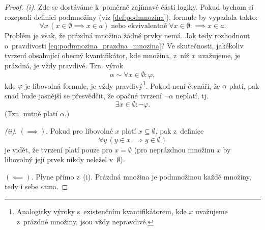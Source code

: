 \begin{proof}
    \textit{(i)}. Zde se dostáváme k~poměrně zajímavé části logiky. Pokud bychom si rozepsali definici podmnožiny (viz \ref{def:podmnozina}), formule by vypadala takto:
    \begin{equation}\label{eq:podmnozina_prazdna_mnozina}
        \forall x\,(x\in\emptyset \implies x\in a)\;\text{nebo ekvivalentně}\;\forall x\in\emptyset:\implies x\in a.
    \end{equation}
    Problém je však, že prázdná množina žádné prvky nemá. Jak tedy rozhodnout o~pravdivosti \eqref{eq:podmnozina_prazdna_mnozina}? Ve skutečnosti, jakékoliv tvrzení obsahující obecný kvantifikátor, kde množina, z~níž $x$ uvažujeme, je prázdná, je vždy pravdivé. Tzn. výrok
    \begin{equation*}
        \alpha\sim\forall x\in\emptyset: \varphi,
    \end{equation*}
    kde $\varphi$ je libovolná formule, je vždy pravdivý\footnote{Analogicky výroky s~existenčním kvantifikátorem, kde $x$ uvažujeme z~prázdné množiny, jsou vždy nepravdivé.}. Pokud není čtenáři, že $\alpha$ platí, pak snad bude jasnější se přesvědčit, že opačné tvrzení $\neg\alpha$ neplatí, tj.
    \begin{equation*}
        \exists x\in\emptyset: \neg\varphi.
    \end{equation*}
    (Tzn. nutně platí $\alpha$.)\par
    \textit{(ii)}. \textit{$(\implies)$}. Pokud pro libovolné $x$ platí $x\subseteq\emptyset$, pak z~definice
    \begin{equation*}
        \forall y\,(y\in x \implies y\in\emptyset)
    \end{equation*}
    je vidět, že tvrzení platí pouze pro $x=\emptyset$ (pro neprázdnou množinu $x$ by libovolný její prvek nikdy neležel v~$\emptyset$).\par
    \textit{$(\impliedby)$}. Plyne přímo z~(i). Prázdná množina je podmnožinou každé množiny, tedy i sebe sama.
\end{proof}

